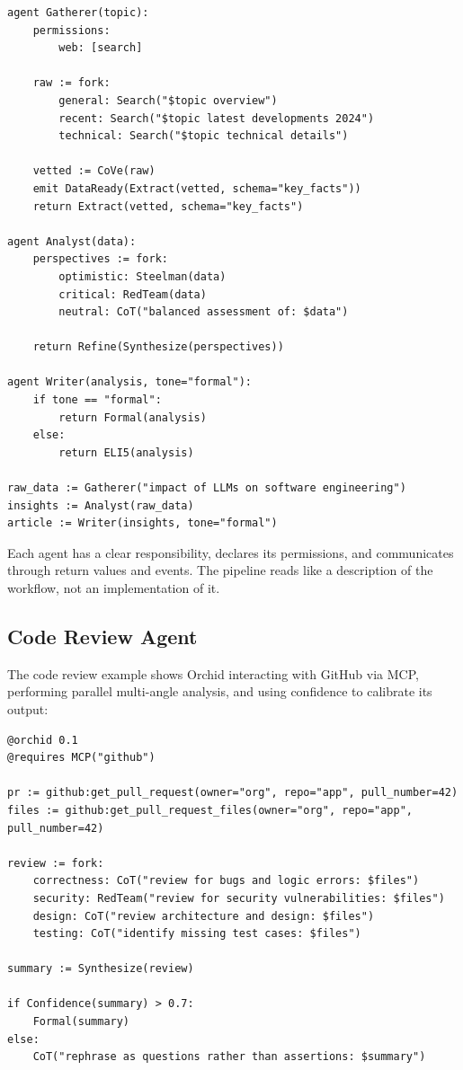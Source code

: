 \documentclass[11pt,a4paper]{article}
\begin{document}
\begin{lstlisting}[language=orchid]
agent Gatherer(topic):
    permissions:
        web: [search]

    raw := fork:
        general: Search("$topic overview")
        recent: Search("$topic latest developments 2024")
        technical: Search("$topic technical details")

    vetted := CoVe(raw)
    emit DataReady(Extract(vetted, schema="key_facts"))
    return Extract(vetted, schema="key_facts")

agent Analyst(data):
    perspectives := fork:
        optimistic: Steelman(data)
        critical: RedTeam(data)
        neutral: CoT("balanced assessment of: $data")

    return Refine(Synthesize(perspectives))

agent Writer(analysis, tone="formal"):
    if tone == "formal":
        return Formal(analysis)
    else:
        return ELI5(analysis)

raw_data := Gatherer("impact of LLMs on software engineering")
insights := Analyst(raw_data)
article := Writer(insights, tone="formal")
\end{lstlisting}

Each agent has a clear responsibility, declares its permissions, and communicates through return values and events. The pipeline reads like a description of the workflow, not an implementation of it.

\subsection{Code Review Agent}

The code review example shows Orchid interacting with GitHub via MCP, performing parallel multi-angle analysis, and using confidence to calibrate its output:

\begin{lstlisting}[language=orchid]
@orchid 0.1
@requires MCP("github")

pr := github:get_pull_request(owner="org", repo="app", pull_number=42)
files := github:get_pull_request_files(owner="org", repo="app", pull_number=42)

review := fork:
    correctness: CoT("review for bugs and logic errors: $files")
    security: RedTeam("review for security vulnerabilities: $files")
    design: CoT("review architecture and design: $files")
    testing: CoT("identify missing test cases: $files")

summary := Synthesize(review)

if Confidence(summary) > 0.7:
    Formal(summary)
else:
    CoT("rephrase as questions rather than assertions: $summary")
\end{lstlisting}
\end{document}
